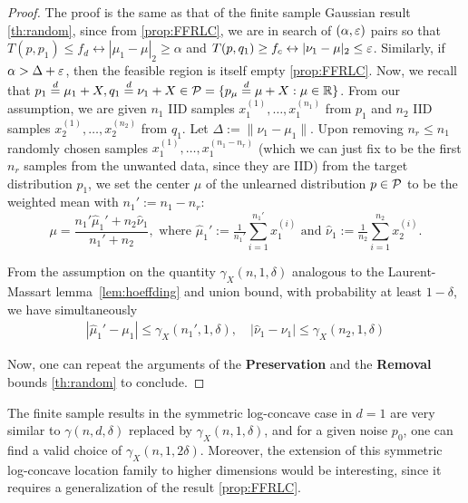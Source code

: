 \begin{proof}
    The proof is the same as that of the finite sample Gaussian result \ref{th:random}, since from \ref{prop:FFRLC}, we are in search of $(\alpha, \varepsilon)$ pairs so that $T(p,p_1) \leq f_d \leftrightarrow |\mu_1-\mu|_2 \geq \alpha  $ and $T(p,q_1) \geq f_c \leftrightarrow |\nu_1-\mu|_2 \leq \varepsilon $. Similarly, if $\alpha >\Delta +\varepsilon$, then the feasible region is itself empty \ref{prop:FFRLC}.
    Now, we recall that $p_1 \overset{d}{=} \mu_1+X, q_1 \overset{d}{=} \nu_1+ X \in \mathcal{P}= \{p_{\mu} \overset{d}{=}\mu+X: \mu \in \mathbb{R}\}$.  
    From our assumption, we are given $n_1$ IID samples $x_1^{(1)}, \ldots, x_1^{(n_1)}$ from $p_1$ and $n_2$ IID samples $x_2^{(1)}, \ldots, x_2^{(n_2)}$  from $q_1$. Let $\Delta:=\|\nu_1-\mu_1\|$. Upon removing $n_r \leq n_1$ randomly chosen samples $x_1^{(1)}, \ldots, x_1^{(n_1 - n_r)}$ (which we can just fix to be the first $n_r$ samples from the unwanted data, since they are IID) from the target distribution $p_1$, we set the center $\mu$ of the unlearned distribution $p\in \mathcal{P}$ to be the weighted mean with $n_1':= n_1-n_r$:
    \begin{equation} \label{eq:empmeanLCRR}
        \mu = \frac{n_1' \hat{\mu}_1' + n_2 \hat{\nu}_1}{n_1' + n_2}, \text{ where }
        \hat{\mu}_1' := \tfrac{1}{n_1'} \sum_{i=1}^{n_1'} x_1^{(i)} \text{ and } \hat{\nu}_1 := \tfrac{1}{n_2} \sum_{i=1}^{n_2} x_2^{(i)}.
    \end{equation}

    
    From the assumption on the quantity $\gamma_X(n,1,\delta)$ analogous to the Laurent-Massart  lemma~\ref{lem:hoeffding} and union bound,  with probability at least $1- \delta$, we  have  simultaneously 
    \begin{align}
        |\hat{\mu}_1' - \mu_1| \leq \gamma_X(n_1', 1, \delta), \quad |\hat{\nu}_1 - \nu_1| \leq  \gamma_X(n_2, 1,\delta)
        \label{eq:hoeffdingLCRR}
    \end{align}

    Now, one can repeat the arguments of the \textbf{Preservation}  and the  \textbf{Removal} bounds \ref{th:random} to conclude.
    \end{proof} 
\begin{remark}
    The finite sample results in the symmetric log-concave case in $d=1$ are very similar to $\gamma(n,d,\delta)$ replaced by $\gamma_X(n,1, \delta)$, and for a given noise $p_0$, one can find a valid choice of $\gamma_X(n,1,2\delta)$. Moreover, the extension of this symmetric log-concave location family to higher dimensions would be interesting, since it requires a generalization of the result \ref{prop:FFRLC}.
\end{remark}
